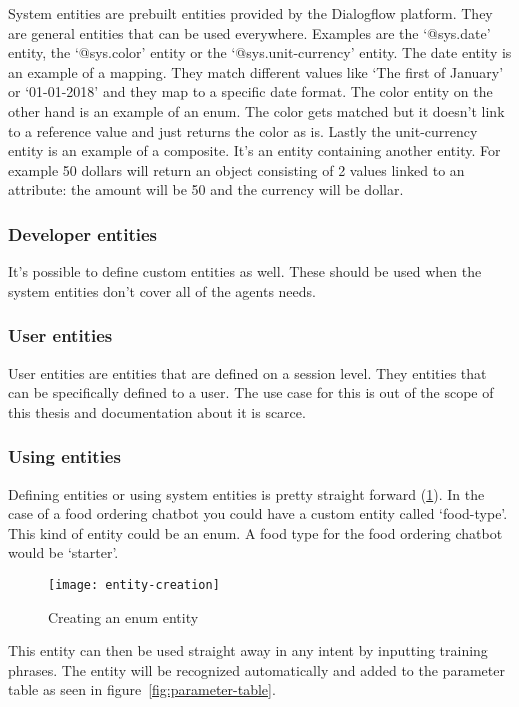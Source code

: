 System entities are prebuilt entities provided by the Dialogflow platform. They are general entities that can be used everywhere. Examples are the `@sys.date' entity, the `@sys.color' entity or the `@sys.unit-currency' entity. The date entity is an example of a mapping. They match different values like `The first of January' or `01-01-2018' and they map to a specific date format. The color entity on the other hand is an example of an enum. The color gets matched but it doesn't link to a reference value and just returns the color as is. Lastly the unit-currency entity is an example of a composite. It's an entity containing another entity. For example 50 dollars will return an object consisting of 2 values linked to an attribute: the amount will be 50 and the currency will be dollar.

\subsubsection{Developer entities}

It's possible to define custom entities as well. These should be used when the system entities don't cover all of the agents needs.

\subsubsection{User entities}

User entities are entities that are defined on a session level. They entities that can be specifically defined to a user. The use case for this is out of the scope of this thesis and documentation about it is scarce.

\subsubsection{Using entities}

Defining entities or using system entities is pretty straight forward (\ref{fig:entity-creation}). In the case of a food ordering chatbot you could have a custom entity called `food-type'. This kind of entity could be an enum. A food type for the food ordering chatbot would be `starter'.

\begin{figure}[ht]
	\centering
	\texttt{[image: entity-creation]}\label{fig:entity-creation}
	\caption{Creating an enum entity}
\end{figure}

This entity can then be used straight away in any intent by inputting training phrases. The entity will be recognized automatically and added to the parameter table as seen in figure~\ref{fig:parameter-table}.

